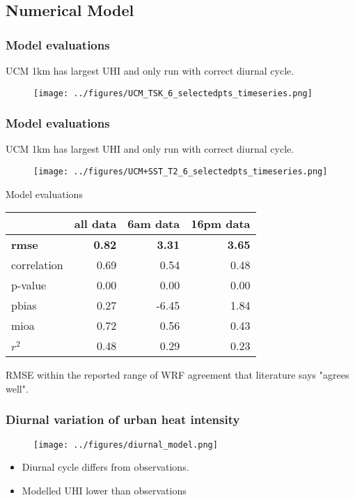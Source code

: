 \documentclass[aspectratio=169, 10pt]{beamer}
\begin{document}
\subsection{Numerical Model}


\begin{frame}
\frametitle{Model evaluations}
UCM 1km has largest UHI and only run with correct diurnal cycle. 
\begin{figure}
\texttt{[image: ../figures/UCM\_TSK\_6\_selectedpts\_timeseries.png]}
\end{figure}
\end{frame}

\begin{frame}
\frametitle{Model evaluations}
UCM 1km has largest UHI and only run with correct diurnal cycle. 
\begin{figure}
\texttt{[image: ../figures/UCM+SST\_T2\_6\_selectedpts\_timeseries.png]}
\end{figure}
\end{frame}

\begin{frame}{Model evaluations}
\center
\begin{tabular}{lrrr}
\toprule
{} &  all data &     6am data&   16pm data \\
\midrule
\bf rmse        &    \bf  0.82 & \bf 3.31 & \bf 3.65 \\
correlation &      0.69 &  0.54 & 0.48 \\
p-value     &      0.00 &  0.00 & 0.00 \\
pbias       &      0.27 & -6.45 & 1.84 \\
mioa        &      0.72 &  0.56 & 0.43 \\
$r^2$   &      0.48 &  0.29 & 0.23 \\
\bottomrule
\end{tabular}
RMSE within the reported range of WRF agreement that literature says "agrees well". 
\end{frame}

\begin{frame}
\frametitle{Diurnal variation of urban heat intensity}
\begin{figure}
\texttt{[image: ../figures/diurnal\_model.png]}
\end{figure}
\begin{itemize}
\item Diurnal cycle differs from observations. 
\item Modelled UHI lower than observations
\end{itemize}
\end{frame}
\end{document}
